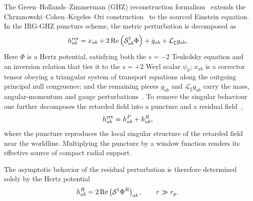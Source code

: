 \documentclass[preprint,aps,nofootinbib,a4paper,superscriptaddress,longbibliography,amsfonts, amssymb,amsmath,titlepage]{revtex4-1}
\numberwithin{equation}{section} %
\renewcommand{\S}{{\mathcal S}}
\newcommand{\Lie}{{\mathcal L}}
\renewcommand{\Re}{\operatorname{Re}}
\def\beq{\begin{equation}}
\def\eeq{\end{equation}}
\def\beq{\begin{equation}}
\def\eeq{\end{equation}}
\def\p{{\rm p}}
\begin{document}
The Green--Hollands--Zimmerman (GHZ) reconstruction
formalism~\cite{Green:2019nam} extends
the Chrzanowski--Cohen--Kegeles--Ori
construction~\cite{Chrzanowski:1975wv,Cohen:1974cm,Kegeles:1979an,Ori:2002uv}
to the sourced Einstein equation.  In the IRG-GHZ puncture scheme, the metric perturbation
is decomposed as
\begin{equation}\label{eq:h GHZ}
h^{\rm ret}_{ab} =
	x_{ab}
	+ 2\Re\left( \S^{\dagger}_{ab}\Phi \right)
	+ \dot g_{ab} + \Lie_{\xi}g_{ab},
\end{equation}
Here $\Phi$ is a Hertz potential, satisfying both the $s=-2$
Teukolsky equation and an inversion relation that
ties it to the $s=+2$ Weyl scalar $\psi_{0}$; $x_{ab}$ is a corrector tensor
obeying a triangular system of transport equations along the outgoing
principal null congruence; and the remaining pieces $\dot g_{ab}$ and
$\Lie_{\xi}g_{ab}$ carry the mass, angular-momentum and gauge
perturbations~\cite{Merlin:2016boc,vandeMeent:2017fqk}.
To remove the singular behaviour one further decomposes the retarded field
into a puncture and a residual field~\cite{Toomani:2021jlo},
\begin{equation}
	h^{\rm ret}_{ab}
		=
		h^{P}_{ab}
		+
		h^{R}_{ab},
\end{equation}
where the puncture reproduces the local singular structure of the
retarded field near the worldline.  Multiplying the puncture by a window
function renders its effective source of compact radial support.

The asymptotic behavior of the residual perturbation
is therefore determined solely by the Hertz potential
\beq
h^{R}_{ab}
=
2\Re\left(\S^{\dagger}\Phi^R\right)_{ab},
\qquad r\gg r_\p.
\eeq
\end{document}
